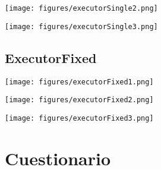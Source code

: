 \documentclass[12pt]{article}
\begin{document}
\begin{center}

  \texttt{[image: figures/executorSingle2.png]}
\end{center}

\begin{center}

  \texttt{[image: figures/executorSingle3.png]}
\end{center}

\subsection*{ExecutorFixed}
\begin{center}

  \texttt{[image: figures/executorFixed1.png]}
\end{center}

\begin{center}

  \texttt{[image: figures/executorFixed2.png]}
\end{center}

\begin{center}

  \texttt{[image: figures/executorFixed3.png]}
\end{center}

\section*{Cuestionario}
\end{document}
